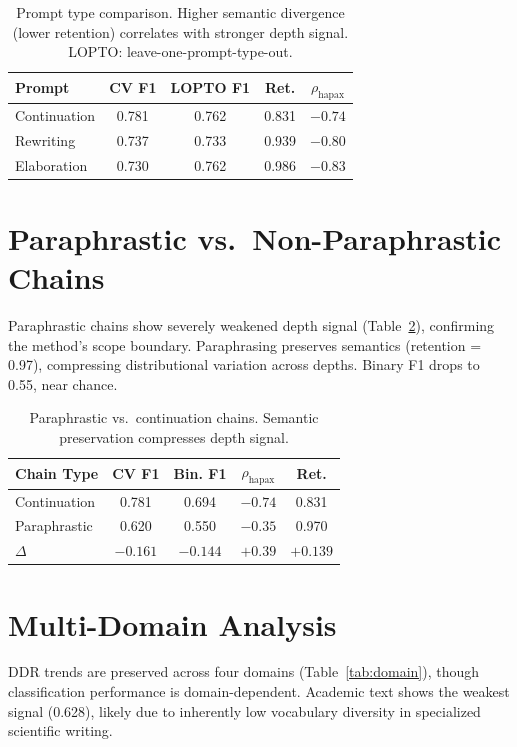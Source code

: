 \documentclass[11pt,a4paper]{article}
\begin{document}
\begin{table}[h]
\centering
\small
\begin{tabular}{lcccc}
\toprule
\textbf{Prompt} & \textbf{CV F1} & \textbf{LOPTO F1} & \textbf{Ret.} & \textbf{$\rho_\text{hapax}$} \\
\midrule
Continuation & 0.781 & 0.762 & 0.831 & $-0.74$ \\
Rewriting & 0.737 & 0.733 & 0.939 & $-0.80$ \\
Elaboration & 0.730 & 0.762 & 0.986 & $-0.83$ \\
\bottomrule
\end{tabular}
\caption{Prompt type comparison. Higher semantic divergence (lower retention) correlates with stronger depth signal. LOPTO: leave-one-prompt-type-out.}
\label{tab:prompt}
\end{table}

\section{Paraphrastic vs.\ Non-Paraphrastic Chains}
\label{app:para}

Paraphrastic chains show severely weakened depth signal (Table~\ref{tab:para}), confirming the method's scope boundary.
Paraphrasing preserves semantics (retention = 0.97), compressing distributional variation across depths.
Binary F1 drops to 0.55, near chance.

\begin{table}[h]
\centering
\small
\begin{tabular}{lcccc}
\toprule
\textbf{Chain Type} & \textbf{CV F1} & \textbf{Bin. F1} & \textbf{$\rho_\text{hapax}$} & \textbf{Ret.} \\
\midrule
Continuation & 0.781 & 0.694 & $-0.74$ & 0.831 \\
Paraphrastic & 0.620 & 0.550 & $-0.35$ & 0.970 \\
$\Delta$ & $-0.161$ & $-0.144$ & $+0.39$ & $+0.139$ \\
\bottomrule
\end{tabular}
\caption{Paraphrastic vs.\ continuation chains. Semantic preservation compresses depth signal.}
\label{tab:para}
\end{table}

\section{Multi-Domain Analysis}
\label{app:domain}

DDR trends are preserved across four domains (Table~\ref{tab:domain}), though classification performance is domain-dependent.
Academic text shows the weakest signal (0.628), likely due to inherently low vocabulary diversity in specialized scientific writing.
\end{document}
